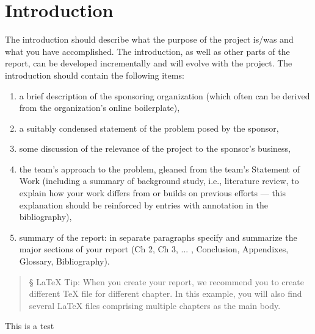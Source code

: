 \chapter{Introduction}\label{Ch:Introduction}

The introduction should describe what the purpose of the project is/was and what you have accomplished.
The introduction, as well as other parts of the report, can be developed incrementally and will evolve with the project.
The introduction should contain the following items:
\begin{enumerate}
\item a brief description of the sponsoring organization (which often can be derived from the organization's online boilerplate), 
\item a suitably condensed statement of the problem posed by the sponsor, 
\item some discussion of the relevance of the project to the sponsor's business, 
\item the team's approach to the problem, gleaned from the team's Statement of Work (including a summary of background study, i.e., literature review, to explain how your work differs from or builds on previous efforts --- this explanation should be reinforced by entries with annotation in the bibliography),
\item summary of the report: in separate paragraphs specify and summarize the major sections of your report (Ch 2, Ch 3, ... , Conclusion,  Appendixes, Glossary, Bibliography).
\end{enumerate}

\begin{quote}
    \S{} \LaTeX{} Tip: When you create your report, we recommend you to create different TeX file for different chapter. In this example, you will also find several LaTeX files comprising multiple chapters as the main body.  
\end{quote}

This is a test

\endinput
